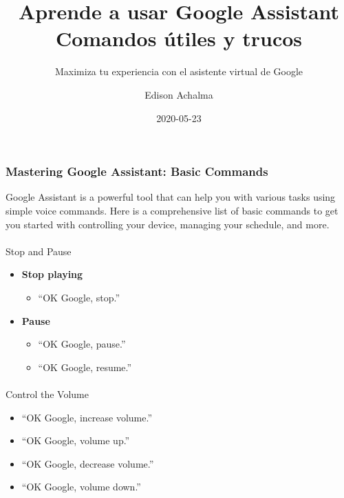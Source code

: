 \documentclass[
  a4paper,
]{article}
\title{Aprende a usar Google Assistant Comandos útiles y trucos}
\subtitle{Maximiza tu experiencia con el asistente virtual de Google}
\author{Edison Achalma}
\date{2020-05-23}
\makeatletter
\let\oldparagraph\paragraph
\renewcommand{\paragraph}{
    \@ifstar
      \xxxParagraphStar
      \xxxParagraphNoStar
  }
\newcommand{\xxxParagraphStar}[1]{\oldparagraph*{#1}\mbox{}}
\newcommand{\xxxParagraphNoStar}[1]{\oldparagraph{#1}\mbox{}}
\providecommand{\tightlist}{%
  \setlength{\itemsep}{0pt}\setlength{\parskip}{0pt}}\usepackage{longtable,booktabs,array}
\makeatother
\begin{document}
\maketitle

\subsubsection{Mastering Google Assistant: Basic
Commands}\label{mastering-google-assistant-basic-commands}

Google Assistant is a powerful tool that can help you with various tasks
using simple voice commands. Here is a comprehensive list of basic
commands to get you started with controlling your device, managing your
schedule, and more.

\paragraph{Stop and Pause}\label{stop-and-pause}

\begin{itemize}
\tightlist
\item
  \textbf{Stop playing}

  \begin{itemize}
  \tightlist
  \item
    ``OK Google, stop.''
  \end{itemize}
\item
  \textbf{Pause}

  \begin{itemize}
  \tightlist
  \item
    ``OK Google, pause.''
  \item
    ``OK Google, resume.''
  \end{itemize}
\end{itemize}

\paragraph{Control the Volume}\label{control-the-volume}

\begin{itemize}
\tightlist
\item
  ``OK Google, increase volume.''
\item
  ``OK Google, volume up.''
\item
  ``OK Google, decrease volume.''
\item
  ``OK Google, volume down.''
\end{itemize}
\end{document}
